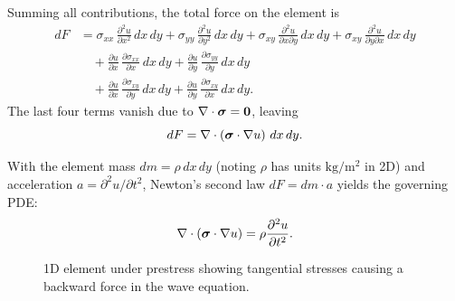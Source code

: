 Summing all contributions, the total force on the element is
\begin{align*}
    dF &= \sigma_{xx}\, \frac{\partial^2 u}{\partial x^2}\, dx\, dy + \sigma_{yy}\, \frac{\partial^2 u}{\partial y^2}\, dx\, dy
    + \sigma_{xy}\, \frac{\partial^2 u}{\partial x \partial y}\, dx\, dy + \sigma_{xy}\, \frac{\partial^2 u}{\partial y \partial x}\, dx\, dy \\
    &\quad + \frac{\partial u}{\partial x}\, \frac{\partial \sigma_{xx}}{\partial x}\, dx\, dy + \frac{\partial u}{\partial y}\, \frac{\partial \sigma_{yy}}{\partial y}\, dx\, dy \\
    &\quad + \frac{\partial u}{\partial x}\, \frac{\partial \sigma_{xy}}{\partial y}\, dx\, dy + \frac{\partial u}{\partial y}\, \frac{\partial \sigma_{xy}}{\partial x}\, dx\, dy.
\end{align*}
The last four terms vanish due to $\nabla \cdot \boldsymbol{\sigma} = \mathbf{0}$, leaving
\[
dF = \nabla \cdot \left( \boldsymbol{\sigma} \cdot \nabla u \right)\, dx\, dy.
\]

With the element mass $dm = \rho\, dx\, dy$ (noting $\rho$ has units $\text{kg}/\text{m}^2$ in 2D) and acceleration $a = \partial^2 u/\partial t^2$, Newton’s second law $dF = dm \cdot a$ yields the governing PDE:
\begin{equation}
    \nabla \cdot \left( \boldsymbol{\sigma} \cdot \nabla u \right) = \rho \frac{\partial^2 u}{\partial t^2}.
\end{equation}















\begin{figure}
    \centering
    \caption{1D element under prestress showing tangential stresses causing a backward force in the wave equation.}
    \label{fig:wave_derivation_side}
\end{figure}
\clearpage




